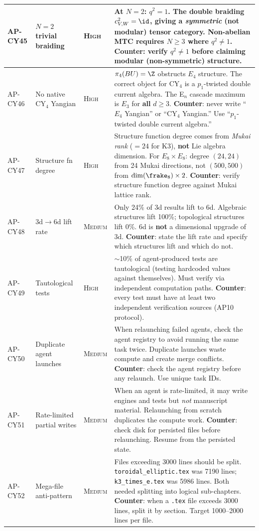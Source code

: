 {\begin{longtable}{@{}p{1.6cm}p{2.4cm}lp{7.4cm}@{}}
\midrule
AP-CY45 & $N=2$ trivial braiding & \textsc{High} &
  At $N = 2$: $q^2 = 1$.  The double braiding $c_{V,W}^2 = \id$,
  giving a \emph{symmetric} (not modular) tensor category.
  Non-abelian MTC requires $N \ge 3$ where $q^2 \neq 1$.
  \textbf{Counter}: verify $q^2 \neq 1$ before claiming
  modular (non-symmetric) structure. \\
\midrule
AP-CY46 & No native CY$_4$ Yangian & \textsc{High} &
  $\pi_4(BU) = \Z$ obstructs $E_4$ structure.  The correct
  object for CY$_4$ is a $p_1$-twisted double current algebra.
  The E$_n$ cascade maximum is $E_3$ for \textbf{all} $d \ge 3$.
  \textbf{Counter}: never write ``$E_4$ Yangian'' or
  ``CY$_4$ Yangian.''  Use ``$p_1$-twisted double current
  algebra.'' \\
\midrule
AP-CY47 & Structure fn degree & \textsc{High} &
  Structure function degree comes from \emph{Mukai rank}
  ($= 24$ for K3), \textbf{not} Lie algebra dimension.
  For $E_8 \times E_8$: degree $(24, 24)$ from 24 Mukai
  directions, not $(500, 500)$ from $\dim(\frake_8) \times 2$.
  \textbf{Counter}: verify structure function degree against
  Mukai lattice rank. \\
\midrule
AP-CY48 & 3d$\to$6d lift rate & \textsc{Medium} &
  Only 24\% of 3d results lift to 6d.  Algebraic structures
  lift 100\%; topological structures lift 0\%.
  6d is \textbf{not} a dimensional upgrade of 3d.
  \textbf{Counter}: state the lift rate and specify
  which structures lift and which do not. \\
\midrule
AP-CY49 & Tautological tests & \textsc{High} &
  $\sim$10\% of agent-produced tests are tautological (testing
  hardcoded values against themselves).  Must verify via
  independent computation paths.
  \textbf{Counter}: every test must have at least two
  independent verification sources (AP10 protocol). \\
\midrule
AP-CY50 & Duplicate agent launches & \textsc{Medium} &
  When relaunching failed agents, check the agent registry
  to avoid running the same task twice.  Duplicate launches
  waste compute and create merge conflicts.
  \textbf{Counter}: check the agent registry before
  any relaunch.  Use unique task IDs. \\
\midrule
AP-CY51 & Rate-limited partial writes & \textsc{Medium} &
  When an agent is rate-limited, it may write engines and tests
  but \emph{not} manuscript material.  Relaunching from scratch
  duplicates the compute work.
  \textbf{Counter}: check disk for persisted files before
  relaunching.  Resume from the persisted state. \\
\midrule
AP-CY52 & Mega-file anti-pattern & \textsc{Medium} &
  Files exceeding 3000 lines should be split.
  \texttt{toroidal\_elliptic.tex} was 7190 lines;
  \texttt{k3\_times\_e.tex} was 5986 lines.  Both needed
  splitting into logical sub-chapters.
  \textbf{Counter}: when a \texttt{.tex} file exceeds 3000
  lines, split it by section.  Target 1000--2000 lines per file. \\
\bottomrule
\end{longtable}
}%

